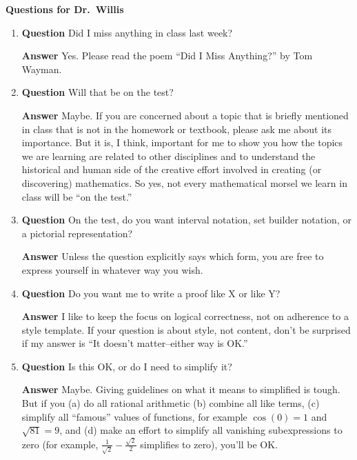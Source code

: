 \documentclass[11pt]{article}
\newcounter{ex}\setcounter{ex}{0}
\begin{document}
\begin{flushleft}
  \large
\textbf{ Questions for Dr.\ Willis}
\end{flushleft}  
\normalsize
\begin{enumerate}

\item \textbf{Question} Did I miss anything in class last week?

\textbf{Answer} Yes.  Please read  the poem “Did I Miss Anything?” by Tom Wayman.  

\item \textbf{Question} Will that be on the test?

\textbf{Answer} Maybe. If you are concerned about a topic that is briefly
mentioned in class that is not in the homework or textbook, please ask me
about its importance. But it is, I think, important for me to 
show you how the topics we are learning are related to other disciplines  
and to understand the historical and human side of the
creative effort involved in creating (or discovering) mathematics. So yes,
not every mathematical morsel we learn in class will be ``on the test.''

\item \textbf{Question} On the test, do you want interval notation, set builder
notation, or a pictorial representation?

\textbf{Answer} Unless the question explicitly says which form,
you are free to express yourself in whatever way you wish.

\item \textbf{Question} Do you want me to write a proof like X or 
like Y?

\textbf{Answer} I like to keep the focus on logical 
correctness, not on adherence to a style template. If your question is about
style, not content, don't be surprised if my answer is ``It doesn't 
matter--either way is OK.'' 

\item \textbf{Question} Is this OK, or do I need to simplify it?

\textbf{Answer} Maybe. Giving guidelines on what it means to 
  simplified is tough. But if you  (a) do all rational arithmetic (b) combine
  all like terms, (c) simplify all ``famous'' values of functions, 
  for example $\cos(0)=1$ and $\sqrt{81} = 9$, and (d) make an effort
  to simplify all vanishing subexpressions to zero (for example, 
  $\frac{1}{\sqrt{2}} - \frac{\sqrt{2}}{2}$ simplifies to zero), you'll be OK.


\end{enumerate}
\end{document}
